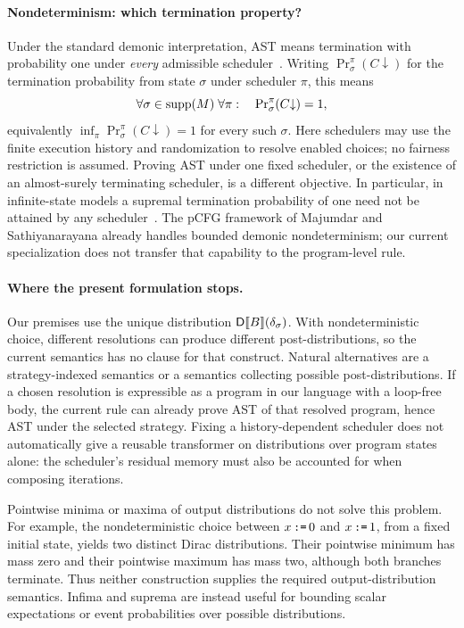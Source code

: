 \paragraph{Nondeterminism: which termination property?}
Under the standard demonic interpretation, AST means termination with probability one under \emph{every} admissible scheduler~\cite{10.1145/3158121,DBLP:journals/pacmpl/MajumdarS25}. Writing $\Pr^{\pi}_{\sigma}(C\mathbin{\downarrow})$ for the termination probability from state $\sigma$ under scheduler $\pi$, this means
\[
  \forall\sigma\in\textnormal{supp}(M)\;\forall\pi:\quad
  \Pr\nolimits^{\pi}_{\sigma}(C\mathbin{\downarrow})=1,
\]
equivalently $\inf_{\pi}\Pr^{\pi}_{\sigma}(C\mathbin{\downarrow})=1$ for every such $\sigma$. Here schedulers may use the finite execution history and randomization to resolve enabled choices; no fairness restriction is assumed. Proving AST under one fixed scheduler, or the existence of an almost-surely terminating scheduler, is a different objective. In particular, in infinite-state models a supremal termination probability of one need not be attained by any scheduler~\cite{DBLP:journals/pacmpl/BatzBKW24}. The pCFG framework of Majumdar and Sathiyanarayana already handles bounded demonic nondeterminism; our current specialization does not transfer that capability to the program-level rule.

\paragraph{Where the present formulation stops.}
Our premises use the unique distribution $\mathsf{D}\llbracket B\rrbracket(\delta_{\sigma})$. With nondeterministic choice, different resolutions can produce different post-distributions, so the current semantics has no clause for that construct. Natural alternatives are a strategy-indexed semantics or a semantics collecting possible post-distributions. If a chosen resolution is expressible as a program in our language with a loop-free body, the current rule can already prove AST of that resolved program, hence AST under the selected strategy. Fixing a history-dependent scheduler does not automatically give a reusable transformer on distributions over program states alone: the scheduler's residual memory must also be accounted for when composing iterations.

Pointwise minima or maxima of output distributions do not solve this problem. For example, the nondeterministic choice between $x\,\textnormal{\texttt{:=}}\,0$ and $x\,\textnormal{\texttt{:=}}\,1$, from a fixed initial state, yields two distinct Dirac distributions. Their pointwise minimum has mass zero and their pointwise maximum has mass two, although both branches terminate. Thus neither construction supplies the required output-distribution semantics. Infima and suprema are instead useful for bounding scalar expectations or event probabilities over possible distributions.

